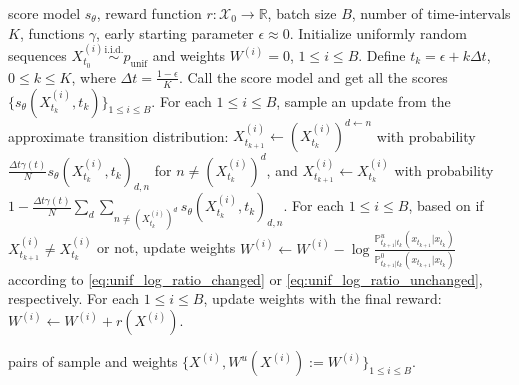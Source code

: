 \documentclass{article}
\theoremstyle{remark}
\renewcommand{\P}{\mathbb{P}}
\newcommand{\iid}{\stackrel{\mathrm{i.i.d.}}{\sim}}
\newcommand{\R}{\mathbb{R}}
\newcommand{\cX}{\mathcal{X}}
\newcommand{\punif}{p_\mathrm{unif}}
\begin{document}
\begin{algorithm}[h]
\caption{\texttt{Sample\_Trajectories\_Unif}: Sample trajectories and compute weights for UDNS.}
\label{alg:sample_traj_unif}
\begin{algorithmic}[1]
\Require score model $s_{\theta}$, reward function $r:\cX_0\to\R$, batch size $B$, number of time-intervals $K$, functions $\gamma$, early starting parameter $\epsilon\approx0$.
\State Initialize uniformly random sequences $X^{(i)}_{t_0}\iid\punif$ and weights $W^{(i)}=0$, $1\le i\le B$.
\State Define $t_k=\epsilon+k\Delta t$, $0\le k\le K$, where $\Delta t=\frac{1-\epsilon}{K}$. 
    \State Call the score model and get all the scores $\{s_\theta(X^{(i)}_{t_k},t_k)\}_{1\le i\le B}$.
    \State For each $1\le i\le B$, sample an update from the approximate transition distribution: $X^{(i)}_{t_{k+1}}\gets(X^{(i)}_{t_k})^{d\gets n}$ with probability $\frac{\Delta t\gamma(t)}{N}s_\theta(X^{(i)}_{t_k},t_k)_{d,n}$ for $n\ne(X^{(i)}_{t_k})^d$, and $X^{(i)}_{t_{k+1}}\gets X^{(i)}_{t_k}$ with probability $1-\frac{\Delta t\gamma(t)}{N}\sum_d\sum_{n\ne(X^{(i)}_{t_k})^d}s_\theta(X^{(i)}_{t_k},t_k)_{d,n}$.
    \State For each $1\le i\le B$, based on if $X^{(i)}_{t_{k+1}}\ne X^{(i)}_{t_{k}}$ or not, update weights $W^{(i)}\gets W^{(i)}-\log\frac{\P^u_{t_{k+1}|t_k}(x_{t_{k+1}}|x_{t_k})}{\P^0_{t_{k+1}|t_k}(x_{t_{k+1}}|x_{t_k})}$ according to \cref{eq:unif_log_ratio_changed} or \cref{eq:unif_log_ratio_unchanged}, respectively.
\EndFor
\State For each $1\le i\le B$, update weights with the final reward: $W^{(i)}\gets W^{(i)}+r(X^{(i)})$.

\noindent\Return pairs of sample and weights $\{X^{(i)},W^u(X^{(i)}):=W^{(i)}\}_{1\le i\le B}$.
\end{algorithmic}
\end{algorithm}
\end{document}
